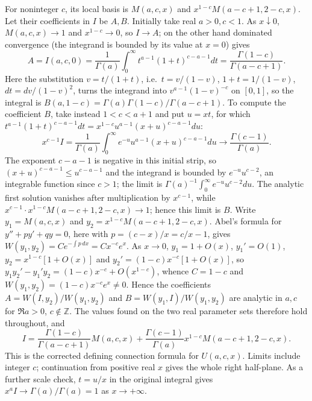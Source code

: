 For noninteger $c$, its local basis is
$M(a,c,x)$ and $x^{1-c}M(a-c+1,2-c,x)$.  Let their coefficients
in $I$ be $A,B$.  Initially take real $a>0,c<1$.  As
$x\downarrow0$, $M(a,c,x)\to1$ and $x^{1-c}\to0$, so $I\to A$; on
the other hand dominated convergence (the integrand is bounded by
its value at $x=0$) gives
\[
A=I(a,c,0)
 =\frac1{\Gamma(a)}\int_0^\infty t^{a-1}(1+t)^{c-a-1}dt
 =\frac{\Gamma(1-c)}{\Gamma(a-c+1)}.
\]
Here the substitution $v=t/(1+t)$, i.e.\ $t=v/(1-v)$,
$1+t=1/(1-v)$, $dt=dv/(1-v)^2$, turns the integrand into
$v^{a-1}(1-v)^{-c}$ on $[0,1]$, so the integral is
$B(a,1-c)=\Gamma(a)\Gamma(1-c)/\Gamma(a-c+1)$.
To compute the coefficient $B$, take instead $1<c<a+1$ and put
$u=xt$, for which
$t^{a-1}(1+t)^{c-a-1}dt=x^{1-c}u^{a-1}(x+u)^{c-a-1}du$:
\[
x^{c-1}I=\frac1{\Gamma(a)}
 \int_0^\infty e^{-u}u^{a-1}(x+u)^{c-a-1}du
 \longrightarrow\frac{\Gamma(c-1)}{\Gamma(a)}.
\]
The exponent $c-a-1$ is negative in this initial strip, so
$(x+u)^{c-a-1}\le u^{c-a-1}$ and the integrand is bounded by
$e^{-u}u^{c-2}$, an integrable function since $c>1$; the limit is
$\Gamma(a)^{-1}\int_0^\infty e^{-u}u^{c-2}du$.
The analytic first solution vanishes after multiplication by
$x^{c-1}$, while $x^{c-1}\cdot x^{1-c}M(a-c+1,2-c,x)\to1$; hence
this limit is $B$.  Write $y_1=M(a,c,x)$ and
$y_2=x^{1-c}M(a-c+1,2-c,x)$.  Abel's formula for $y''+py'+qy=0$,
here with $p=(c-x)/x=c/x-1$, gives
$W(y_1,y_2)=Ce^{-\int p\,dx}=Cx^{-c}e^x$.  As $x\to0$,
$y_1=1+O(x)$, $y_1'=O(1)$, $y_2=x^{1-c}[1+O(x)]$ and
$y_2'=(1-c)x^{-c}[1+O(x)]$, so
$y_1y_2'-y_1'y_2=(1-c)x^{-c}+O(x^{1-c})$, whence $C=1-c$ and
$W(y_1,y_2)=(1-c)x^{-c}e^x\ne0$.  Hence the
coefficients $A=W(I,y_2)/W(y_1,y_2)$ and $B=W(y_1,I)/W(y_1,y_2)$
are analytic in $a,c$ for $\Re a>0$, $c\notin\mathbb Z$.  The
values found on the two real parameter sets therefore hold
throughout, and
\[
I=\frac{\Gamma(1-c)}{\Gamma(a-c+1)}M(a,c,x)
 +\frac{\Gamma(c-1)}{\Gamma(a)}x^{1-c}M(a-c+1,2-c,x).
\]
This is the corrected defining connection formula for
$\boxed{U(a,c,x)}$.  Limits include integer $c$; continuation
from positive real $x$ gives the whole right half-plane.
As a further scale check, $t=u/x$ in the original integral gives
$x^aI\to\Gamma(a)/\Gamma(a)=1$ as $x\to+\infty$.

